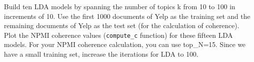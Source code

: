 \documentclass[]{article}
\newenvironment{Shaded}{\begin{snugshade}}{\end{snugshade}}
\newcommand{\CommentTok}[1]{\textcolor[rgb]{0.56,0.35,0.01}{\textit{#1}}}
\newcommand{\ControlFlowTok}[1]{\textcolor[rgb]{0.13,0.29,0.53}{\textbf{#1}}}
\newcommand{\DataTypeTok}[1]{\textcolor[rgb]{0.13,0.29,0.53}{#1}}
\newcommand{\DecValTok}[1]{\textcolor[rgb]{0.00,0.00,0.81}{#1}}
\newcommand{\KeywordTok}[1]{\textcolor[rgb]{0.13,0.29,0.53}{\textbf{#1}}}
\newcommand{\NormalTok}[1]{#1}
\newcommand{\OperatorTok}[1]{\textcolor[rgb]{0.81,0.36,0.00}{\textbf{#1}}}
\newcommand{\StringTok}[1]{\textcolor[rgb]{0.31,0.60,0.02}{#1}}
\begin{document}
\begin{Shaded}
\end{Shaded}

Build ten LDA models by spanning the number of topics k from 10 to 100
in increments of 10. Use the first 1000 documents of Yelp as the
training set and the remaining documents of Yelp as the test set (for
the calculation of coherence). Plot the NPMI coherence values
(\texttt{compute\_c} function) for these fifteen LDA models. For your
NPMI coherence calculation, you can use top\_N=15. Since we have a small
training set, increase the iterations for LDA to 100.
\end{document}
